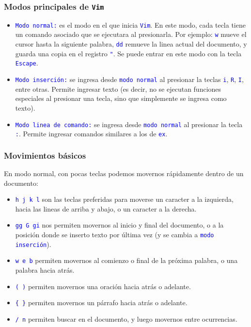 \documentclass[11pt,a4paper,spanish]{beamer}
\newcommand{\cw}[1]{\mbox{\texttt{\textcolor{blue}{#1}}}}
\newcommand{\dq}[0]{\Verb+"+}
\begin{document}
\begin{frame}

    \frametitle{Modos principales de \texttt{Vim}}

    \begin{itemize}
        \item \cw{Modo normal:} es el modo en el que inicia \cw{Vim}. En este
            modo, cada tecla tiene un comando asociado que se ejecutara al
            presionarla. Por ejemplo: \cw{w} mueve el cursor hasta la
            siguiente palabra, \cw{dd} remueve la linea actual del documento,
            y guarda una copia en el registro \cw{\dq{}}. Se puede entrar en este
            modo con la tecla \cw{Escape}.
        \item \cw{Modo inserción:} se ingresa desde \cw{modo normal} al presionar
            la teclas \cw{i}, \cw{R}, \cw{I}, entre otras. Permite ingresar
            texto (es decir, no se ejecutan funciones especiales al presionar
            una tecla, sino que simplemente se ingresa como texto).
        \item \cw{Modo linea de comando:} se ingresa desde \cw{modo normal} al
            presionar la tecla \cw{:}. Permite ingresar comandos similares a
            los de \cw{ex}.
    \end{itemize}

\end{frame}

\begin{frame}

    \frametitle{Movimientos básicos}

    En modo normal, con pocas teclas podemos movernos rápidamente dentro de un
    documento:

    \begin{itemize}
        \item \cw{h j k l} son las teclas preferidas para moverse un caracter
            a la izquierda, hacia las lineas de arriba y abajo, o un caracter
            a la derecha.
        \item \cw{gg G gi} nos permiten movernos al inicio y final del
            documento, o a la posición donde se inserto texto por última vez
            (y se cambia a \cw{modo inserción}).
        \item \cw{w e b} permiten movernos al comienzo o final de la próxima
            palabra, o una palabra hacia atrás.
        \item \cw{( )} permiten movernos una oración hacia atrás o adelante.
        \item \cw{\{ \}} permiten movernos un párrafo hacia atrás o adelante.
        \item \cw{/ n} permiten buscar en el documento, y luego movernos entre
            ocurrencias.
    \end{itemize}

\end{frame}
\end{document}
